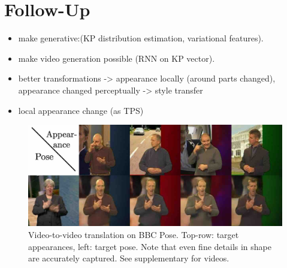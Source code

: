 \section{Follow-Up}
	\begin{itemize}
		\item make generative:(KP distribution estimation, variational features).
		\item make video generation possible (RNN on KP vector).
		\item better transformations -> appearance locally (around parts changed), appearance changed perceptually -> style transfer
		\item local appearance change (as TPS)
	\end{itemize}


	\begin{figure}[t]
		\centering
		\includegraphics[trim={0cm 0cm 0cm 0cm},clip, width=.7\linewidth]{fig/factor/bbcthumb5}
		\caption{Video-to-video translation on BBC Pose. Top-row: target appearances, left: target pose.
		Note that even fine details in shape are accurately captured. See supplementary for videos.}
		\label{fig:bbcthumb}
	\end{figure}

